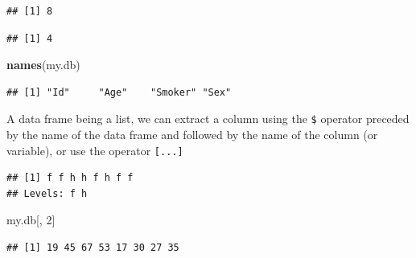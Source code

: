 \documentclass[]{book}
\newenvironment{Shaded}{\begin{snugshade}}{\end{snugshade}}
\newcommand{\CommentTok}[1]{\textcolor[rgb]{0.56,0.35,0.01}{\textit{#1}}}
\newcommand{\DecValTok}[1]{\textcolor[rgb]{0.00,0.00,0.81}{#1}}
\newcommand{\KeywordTok}[1]{\textcolor[rgb]{0.13,0.29,0.53}{\textbf{#1}}}
\newcommand{\NormalTok}[1]{#1}
\newcommand{\OperatorTok}[1]{\textcolor[rgb]{0.81,0.36,0.00}{\textbf{#1}}}
\newcommand{\OtherTok}[1]{\textcolor[rgb]{0.56,0.35,0.01}{#1}}
\newcommand{\StringTok}[1]{\textcolor[rgb]{0.31,0.60,0.02}{#1}}
\begin{document}
\begin{verbatim}
## [1] 8
\end{verbatim}

\begin{verbatim}
## [1] 4
\end{verbatim}

\begin{Shaded}
\begin{Highlighting}[]
\KeywordTok{names}\NormalTok{(my.db)}
\end{Highlighting}
\end{Shaded}

\begin{verbatim}
## [1] "Id"     "Age"    "Smoker" "Sex"
\end{verbatim}

A data frame being a list, we can extract a column using the \texttt{\$} operator preceded by the name of the data frame and followed by the name of the column (or variable), or use the operator \texttt{{[}...{]}}

\begin{Shaded}
\end{Shaded}

\begin{verbatim}
## [1] f f h h f h f f
## Levels: f h
\end{verbatim}

\begin{Shaded}
\begin{Highlighting}[]
\NormalTok{my.db[, }\DecValTok{2}\NormalTok{]}
\end{Highlighting}
\end{Shaded}

\begin{verbatim}
## [1] 19 45 67 53 17 30 27 35
\end{verbatim}

\begin{Shaded}
\end{Shaded}
\end{document}
